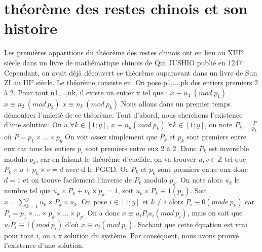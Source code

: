 \documentclass[a4paper, 11pt]{report}
\begin{document}
\section{théorème des restes chinois et son histoire}
Les premières apparitions du théorème des restes chinois ont eu lieu au XIII° siècle  dans un livre de mathématique chinois de Qin JUSHIO publié en 1247. Cependant, on avait déjà découvert ce théorème auparavant dans un livre de Sun ZI au III° siècle. Le théorème consiste en:
On pose p1,...,pk des entiers premiers 2 à 2. Pour tout n1,...,nk, il existe un entier x tel que :
\newline
$ x\equiv n_1 \: (mod \;  p_1)$ 
\newline
$ x\equiv n_2 \: (mod \: p_2)$
\newline
$ x \equiv n_k \:(mod\: p_k)$
\newline
\newline
\newline
\newline
\newline
Nous allons dans un premier temps démontrer l'unicité de ce théorème.
\newline
Tout d'abord, nous cherchons l'existence d'une solution: \newline
On a $\forall k \in [1;y]  $, $x\equiv n_k (mod \: p_k)$ \newline
$\forall k \in [1;y] $, on note $P_k=\frac{P}{p_k} $ où $P=p_1 \times  ... \times p_y$ \newline
On voit assez simplement que $P_k$ et $p_k$ sont premiers entre eux car tous les entiers $p_i$ sont premiers entre eux 2 à 2. Donc $P_k$ est inversible modulo 
$p_k$, car en faisant le théorème d'euclide, on va trouver $u,v\in \mathbb{Z}$ tel que $P_k\times u + p_k \times v = d$ avec d le PGCD. Or $P_k$ et $p_k$ sont premiers entre eux donc $d=1$ et on trouve facilement l'inverse de $P_k$ modulo $p_k$. \newline
On note alors $u_k$ le nombre tel que $u_k\times P_k + v_k\times p_k= 1$, soit $u_k\times P_k\equiv 1(p_k)$. \newline
Soit $x=\sum_{k = 1}^{y} u_k\times P_k\times n_k$. On pose $i\in [1;y]$ et $k\neq i$ alors $P_i\equiv 0(mode \: p_k)$ car $P_i=p_1\times ... \times p_k \times ...\times p_y$. \newline
On a donc $x\equiv u_i P_i a_i(mod \: p_i)$, mais on sait que $u_i P_i\equiv 1 (mod \: p_i)$ d'où $x\equiv a_i (mod \: p_i)$. Sachant que cette équation est vrai pour tout i, on a x solution du système. \newline
Par conséquent, nous avons prouvé l'existence d'une solution.
\end{document}
